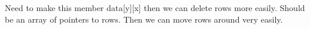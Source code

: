 
\begin{DoxyRefList}
\item[\label{todo__todo000001}%
\Hypertarget{todo__todo000001}%
Member \hyperlink{structBoard_ae1c9aa90b404ac7b06bd6fea2a865d16}{Board\+:\+:data} ]Need to make this member data\mbox{[}y\mbox{]}\mbox{[}x\mbox{]} then we can delete rows more easily. Should be an array of pointers to rows. Then we can move rows around very easily. 
\end{DoxyRefList}